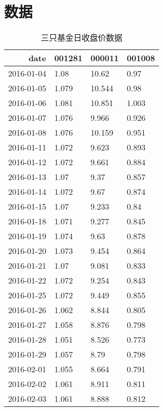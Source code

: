 
\section{数据}
\begin{center}
\begin{longtable}{r lll}
    \caption{三只基金日收盘价数据}
    \label{tb:rawdata} \\
     \hline \hline
    date       & 001281 & 000011 & 001008 \\ \hline
    2016-01-04 & 1.08   & 10.62  & 0.97   \\
    2016-01-05 & 1.079  & 10.544 & 0.98   \\
    2016-01-06 & 1.081  & 10.851 & 1.003  \\
    2016-01-07 & 1.076  & 9.966  & 0.926  \\
    2016-01-08 & 1.076  & 10.159 & 0.951  \\
    2016-01-11 & 1.072  & 9.623  & 0.893  \\
    2016-01-12 & 1.072  & 9.661  & 0.884  \\
    2016-01-13 & 1.07   & 9.37   & 0.857  \\
    2016-01-14 & 1.072  & 9.67   & 0.874  \\
    2016-01-15 & 1.07   & 9.233  & 0.84   \\
    2016-01-18 & 1.071  & 9.277  & 0.845  \\
    2016-01-19 & 1.074  & 9.63   & 0.878  \\
    2016-01-20 & 1.073  & 9.454  & 0.864  \\
    2016-01-21 & 1.07   & 9.081  & 0.833  \\
    2016-01-22 & 1.072  & 9.254  & 0.843  \\
    2016-01-25 & 1.072  & 9.449  & 0.855  \\
    2016-01-26 & 1.062  & 8.844  & 0.805  \\
    2016-01-27 & 1.058  & 8.876  & 0.798  \\
    2016-01-28 & 1.051  & 8.526  & 0.773  \\
    2016-01-29 & 1.057  & 8.79   & 0.798  \\
    2016-02-01 & 1.055  & 8.664  & 0.791  \\
    2016-02-02 & 1.061  & 8.911  & 0.811  \\
    2016-02-03 & 1.061  & 8.888  & 0.812  \\

\end{longtable}
\end{center}
